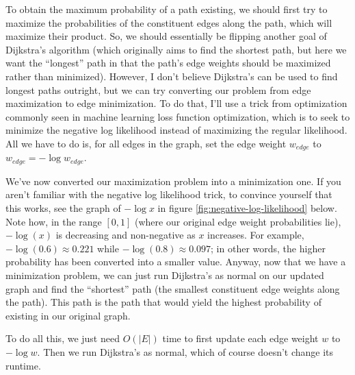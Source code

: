\documentclass[12pt]{article}
\begin{document}
\begin{enumerate}
        To obtain the maximum probability of a path existing, we should first try to maximize the probabilities of the 
        constituent edges along the path, which will maximize their product. So, we should essentially be flipping another goal of 
        Dijkstra's algorithm (which originally aims to find the shortest path, but here we want the ``longest'' path in 
        that the path's edge weights should be maximized rather than minimized). However, I don't believe Dijkstra's can be used 
        to find longest paths outright, but we can try converting our problem from edge maximization to edge minimization. 
        To do that, I'll use a trick from optimization commonly seen in machine learning loss function optimization, which is 
        to seek to minimize the negative log likelihood instead of maximizing the regular likelihood. All we have to do is, for all edges 
        in the graph, set the edge weight $w_{edge}$ to $w_{edge} = -\log w_{edge}$.

        We've now converted our maximization problem into a minimization one. If you aren't familiar with the negative 
        log likelihood trick, to convince yourself that this works, see the graph of $-\log x$ in figure 
        \ref{fig:negative-log-likelihood} below. Note how, in the range $[0, 1]$ (where our original edge weight probabilities 
        lie), $-\log (x)$ is decreasing and non-negative as $x$ increases. For example, $-\log (0.6) \approx 0.221$ while $-\log (0.8) \approx 0.097$; 
        in other words, the higher probability has been converted into a smaller value. Anyway, now that we have a 
        minimization problem, we can just run Dijkstra's as normal on our updated graph and find the ``shortest'' path 
        (the smallest constituent edge weights along the path). This path is the path that would yield the highest 
        probability of existing in our original graph.

        To do all this, we just need $O(|E|)$ time to first update each edge weight $w$ to $-\log w$. Then we run 
        Dijkstra's as normal, which of course doesn't change its runtime.


\end{enumerate}
\end{document}
